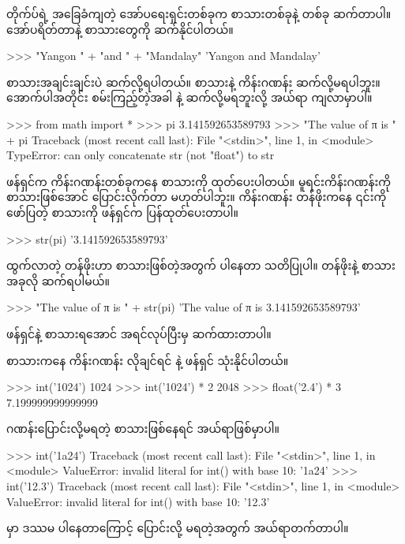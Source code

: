  တိုက်ပ်ရဲ့ အခြေခံကျတဲ့ အော်ပရေးရှင်းတစ်ခုက စာသားတစ်ခုနဲ့ တစ်ခု ဆက်တာပါ။ \fCode{+} အော်ပရိတ်တာနဲ့ စာသားတွေကို ဆက်နိုင်ပါတယ်။ 
%
\setlength{\fboxsep}{0pt}
\begin{codetxt}
>>> "Yangon " + "and " + "Mandalay"
'Yangon and Mandalay'
\end{codetxt}
%
စာသားအချင်းချင်းပဲ ဆက်လို့ရပါတယ်။ စာသားနဲ့ ကိန်းဂဏန်း ဆက်လို့မရပါဘူး။ အောက်ပါအတိုင်း စမ်းကြည့်တဲ့အခါ  နဲ့  ဆက်လို့မရဘူးလို့ အယ်ရာ ကျလာမှာပါ။
%
\setlength{\fboxsep}{0pt}
\begin{codetxt}
>>> from math import *
>>> pi
3.141592653589793
>>> "The value of π is " + pi
Traceback (most recent call last):
  File "<stdin>", line 1, in <module>
TypeError: can only concatenate str (not "float") to str
\end{codetxt}
%
 ဖန်ရှင်က ကိန်းဂဏန်းတစ်ခုကနေ စာသားကို ထုတ်ပေးပါတယ်။ မူရင်းကိန်းဂဏန်းကို စာသားဖြစ်အောင် ပြောင်းလိုက်တာ မဟုတ်ပါဘူး။ ကိန်းဂဏန်း တန်ဖိုးကနေ ၎င်းကိုဖော်ပြတဲ့ စာသားကို ဖန်ရှင်က ပြန်ထုတ်ပေးတာပါ။ 
%
\setlength{\fboxsep}{0pt}
\begin{codetxt}
>>> str(pi)
'3.141592653589793'
\end{codetxt}
%
ထွက်လာတဲ့ တန်ဖိုးဟာ စာသားဖြစ်တဲ့အတွက်  ပါနေတာ သတိပြုပါ။  တန်ဖိုးနဲ့ စာသား အခုလို ဆက်ရပါမယ်။ 
%
\setlength{\fboxsep}{0pt}
\begin{codetxt}
>>> "The value of π is " + str(pi)
'The value of π is 3.141592653589793'
\end{codetxt}
%
 ဖန်ရှင်နဲ့ စာသားရအောင် အရင်လုပ်ပြီးမှ ဆက်ထားတာပါ။

စာသားကနေ ကိန်းဂဏန်း လိုချင်ရင်  နဲ့  ဖန်ရှင် သုံးနိုင်ပါတယ်။
%
\setlength{\fboxsep}{0pt}
\begin{codetxt}
>>> int('1024')
1024
>>> int('1024') * 2
2048
>>> float('2.4') * 3
7.199999999999999
\end{codetxt}
%
ဂဏန်းပြောင်းလို့မရတဲ့ စာသားဖြစ်နေရင် အယ်ရာဖြစ်မှာပါ။
%
\setlength{\fboxsep}{0pt}
\begin{codetxt}
>>> int('1a24')
Traceback (most recent call last):
  File "<stdin>", line 1, in <module>
ValueError: invalid literal for int() with base 10: '1a24'
>>> int('12.3')
Traceback (most recent call last):
  File "<stdin>", line 1, in <module>
ValueError: invalid literal for int() with base 10: '12.3'
\end{codetxt}
%
 မှာ ဒဿမ ပါနေတာကြောင့်  ပြောင်းလို့ မရတဲ့အတွက် အယ်ရာတက်တာပါ။

